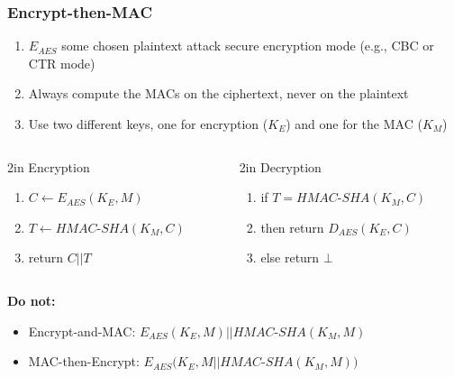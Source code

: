 \documentclass[aspectratio=169, lualatex, 10pt,dvipsnames,svgnames]{beamer} %
\def\enrouge#1{\textcolor{rouge}{#1}}
\begin{document}
\begin{frame}
  \frametitle{Encrypt-then-MAC}
  \vspace{-0.3cm}
  \begin{enumerate}
  \item $E_{AES}$ some chosen plaintext attack secure encryption mode (e.g., CBC or CTR mode)
  \item Always compute the MACs on the ciphertext, never on the plaintext
  \item Use two different keys, one for encryption ($K_E$) and one for the MAC ($K_M$)
  \end{enumerate}
  \medskip{}

  \begin{block}
  \small
  \begin{columns}
    \begin{column}[c]{2in}
      \enrouge{Encryption}
      \begin{enumerate}
      \item $C\leftarrow E_{AES}(K_E, M)$
      \item $T\leftarrow HMAC$-$SHA(K_M, C)$
      \item return $C||T$
      \end{enumerate}
    \end{column}
    \begin{column}[c]{2in}
      \enrouge{Decryption}
      \begin{enumerate}
      \item if $T=HMAC$-$SHA(K_M, C)$
      \item then return $D_{AES}(K_E, C)$
      \item else return $\bot$
      \end{enumerate}
    \end{column}
  \end{columns}
\end{block}
  \bigskip{}
  \normalsize

  \enrouge{\bf Do not:}
  \begin{itemize}
  \item Encrypt-and-MAC: $E_{AES}(K_E, M) || HMAC$-$SHA(K_M, M)$
  \item MAC-then-Encrypt: $E_{AES}(K_E, M|| HMAC$-$SHA(K_M, M)) $
  \end{itemize}

\end{frame}
\end{document}
